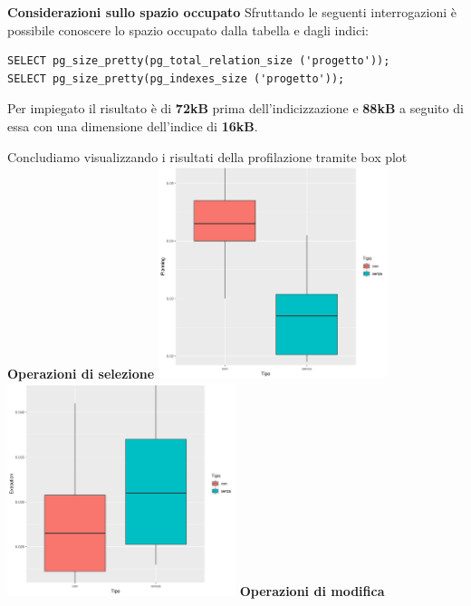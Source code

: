 \documentclass{article}
\begin{document}
\noindent
\newline
\textbf{Considerazioni sullo spazio occupato}
\newline
\newline
Sfruttando le seguenti interrogazioni è possibile conoscere lo spazio occupato dalla tabella e dagli indici:
\begin{verbatim}
SELECT pg_size_pretty(pg_total_relation_size ('progetto'));
SELECT pg_size_pretty(pg_indexes_size ('progetto'));
\end{verbatim}
Per impiegato il risultato è di \textbf{72kB} prima dell'indicizzazione e \textbf{88kB} a seguito di essa con una dimensione dell'indice di \textbf{16kB}.

\newpage
\noindent
\newline
Concludiamo visualizzando i risultati della profilazione tramite box plot
\newline
\newline
\textbf{Operazioni di selezione}
\newline
\newline
\includegraphics[width=0.5\textwidth]{planning_progetto_budget_selezione.png}
\includegraphics[width=0.5\textwidth]{execution_progetto_budget_selezione.png}
\newline
\newline
\textbf{Operazioni di modifica}
\end{document}
